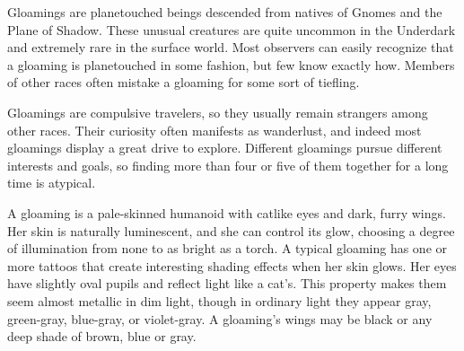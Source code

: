 
Gloamings are planetouched beings descended from natives of Gnomes and the Plane of Shadow. These unusual creatures are quite uncommon in the Underdark and extremely rare in the surface world. Most observers can easily recognize that a gloaming is planetouched in some fashion, but few know exactly how. Members of other races often mistake a gloaming for some sort of tiefling.

Gloamings are compulsive travelers, so they usually remain strangers among other races. Their curiosity often manifests as wanderlust, and indeed most gloamings display a great drive to explore. Different gloamings pursue different interests and goals, so finding more than four or five of them together for a long time is atypical.

A gloaming is a pale-skinned humanoid with catlike eyes and dark, furry wings. Her skin is naturally luminescent, and she can control its glow, choosing a degree of illumination from none to as bright as a torch. A typical gloaming has one or more tattoos that create interesting shading effects when her skin glows. Her eyes have slightly oval pupils and reflect light like a cat’s. This property makes them seem almost metallic in dim light, though in ordinary light they appear gray, green-gray, blue-gray, or violet-gray. A gloaming’s wings may be black or any deep shade of brown, blue or gray.

